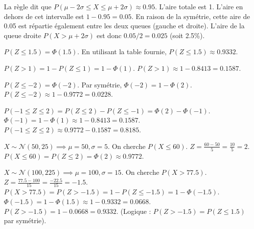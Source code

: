 \begin{correctionbox}
La règle dit que $P(\mu - 2\sigma \le X \le \mu + 2\sigma) \approx 0.95$.
L'aire totale est 1. L'aire en dehors de cet intervalle est $1 - 0.95 = 0.05$.
En raison de la symétrie, cette aire de 0.05 est répartie également entre les deux queues (gauche et droite).
L'aire de la queue droite $P(X > \mu + 2\sigma)$ est donc $0.05 / 2 = 0.025$ (soit 2.5\%).
\end{correctionbox}

\begin{correctionbox}
$P(Z \le 1.5) = \Phi(1.5)$. En utilisant la table fournie, $P(Z \le 1.5) \approx 0.9332$.
\end{correctionbox}

\begin{correctionbox}
$P(Z > 1) = 1 - P(Z \le 1) = 1 - \Phi(1)$.
$P(Z > 1) \approx 1 - 0.8413 = 0.1587$.
\end{correctionbox}

\begin{correctionbox}
$P(Z \le -2) = \Phi(-2)$. Par symétrie, $\Phi(-2) = 1 - \Phi(2)$.
$P(Z \le -2) \approx 1 - 0.9772 = 0.0228$.
\end{correctionbox}

\begin{correctionbox}
$P(-1 \le Z \le 2) = P(Z \le 2) - P(Z \le -1) = \Phi(2) - \Phi(-1)$.
$\Phi(-1) = 1 - \Phi(1) \approx 1 - 0.8413 = 0.1587$.
$P(-1 \le Z \le 2) \approx 0.9772 - 0.1587 = 0.8185$.
\end{correctionbox}

\begin{correctionbox}
$X \sim \mathcal{N}(50, 25) \implies \mu=50, \sigma=5$.
On cherche $P(X \le 60)$.
$Z = \frac{60 - 50}{5} = \frac{10}{5} = 2$.
$P(X \le 60) = P(Z \le 2) = \Phi(2) \approx 0.9772$.
\end{correctionbox}

\begin{correctionbox}
$X \sim \mathcal{N}(100, 225) \implies \mu=100, \sigma=15$.
On cherche $P(X > 77.5)$.
$Z = \frac{77.5 - 100}{15} = \frac{-22.5}{15} = -1.5$.
$P(X > 77.5) = P(Z > -1.5) = 1 - P(Z \le -1.5) = 1 - \Phi(-1.5)$.
$\Phi(-1.5) = 1 - \Phi(1.5) \approx 1 - 0.9332 = 0.0668$.
$P(Z > -1.5) = 1 - 0.0668 = 0.9332$. (Logique : $P(Z > -1.5) = P(Z \le 1.5)$ par symétrie).
\end{correctionbox}

